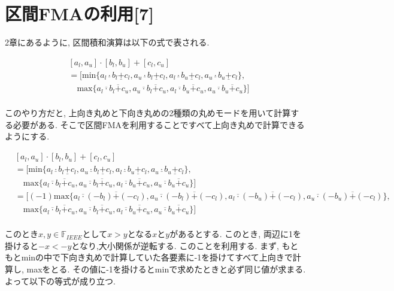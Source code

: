 \documentclass[11pt,a4paper]{jsreport}
\theoremstyle{definition}
\begin{document}
\section{区間FMAの利用[7]}
  2章にあるように, 区間積和演算は以下の式で表される.

\begin{align*}
&[a_l,a_u]\cdot[b_l,b_u] + [c_l,c_u] \\
&= [\text{min}\{a_l \underline{\cdot} b_l \underline{+} c_l,a_u \underline{\cdot} b_l \underline{+} c_l,a_l \underline{\cdot} b_u \underline{+} c_l,a_u \underline{\cdot} b_u \underline{+} c_l\}, \\
& \quad \text{max}\{a_l \overline{\cdot} b_l \overline{+} c_u,a_u \overline{\cdot} b_l \overline{+} c_u,a_l \overline{\cdot} b_u \overline{+} c_u,a_u \overline{\cdot} b_u \overline{+} c_u\}] \\
\end{align*}

このやり方だと, 上向き丸めと下向き丸めの2種類の丸めモードを用いて計算する必要がある. そこで区間FMAを利用することですべて上向き丸めで計算できるようにする.

\begin{align*}
&[a_l,a_u]\cdot[b_l,b_u] + [c_l,c_u] \\
&= [\text{min}\{a_l \underline{\cdot} b_l \underline{+} c_l,a_u \underline{\cdot} b_l \underline{+} c_l,a_l \underline{\cdot} b_u \underline{+} c_l,a_u \underline{\cdot} b_u \underline{+} c_l\}, \\
& \quad  \text{max}\{a_l \overline{\cdot} b_l \overline{+} c_u,a_u \overline{\cdot} b_l \overline{+} c_u,a_l \overline{\cdot} b_u \overline{+} c_u,a_u \overline{\cdot} b_u \overline{+} c_u\}] \\
& = [(-1)\text{max}\{a_l \overline{\cdot} (-b_l) \overline{+} (-c_l),a_u \overline{\cdot} (-b_l) \overline{+} (-c_l),a_l \overline{\cdot} (-b_u) \overline{+} (-c_l),a_u \overline{\cdot} (-b_u) \overline{+} (-c_l)\}, \\
& \quad  \text{max}\{a_l \overline{\cdot} b_l \overline{+} c_u,a_u \overline{\cdot} b_l \overline{+} c_u,a_l \overline{\cdot} b_u \overline{+} c_u,a_u \overline{\cdot} b_u \overline{+} c_u\}] \\
\end{align*}

このとき$x,y \in \mathbb{F}_{IEEE}$として$x>y$となる$x$と$y$があるとする. このとき, 両辺に1を掛けると$-x < -y$となり,大小関係が逆転する. このことを利用する. まず, もともとminの中で下向き丸めで計算していた各要素に-1を掛けてすべて上向きで計算し, maxをとる. その値に-1を掛けるとminで求めたときと必ず同じ値が求まる. よって以下の等式が成り立つ.
\end{document}
